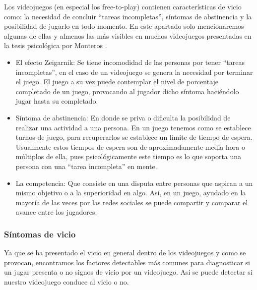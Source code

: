 Los videojuegos (en especial los free-to-play) contienen características de vicio como: la necesidad de concluir “tareas incompletas”, síntomas de abstinencia y la posibilidad de jugarlo en todo momento. En este apartado solo mencionaremos algunas de ellas y almenos las más visibles en muchos videojuegos presentadas en la tesis psicológica por Monteros \cite{montero2014ocios}.

\begin{itemize}
	\item El efecto Zeigarnik: Se tiene incomodidad de las personas por tener “tareas incompletas”, en el caso de un videojuego se genera la necesidad por terminar el juego. El juego a su vez puede contemplar el nivel de porcentaje completado de un juego, provocando al jugador dicho síntoma haciéndolo jugar hasta su completado.
	
	\item Síntoma de abstinencia: En donde se priva o dificulta la posibilidad de realizar una actividad a una persona. En un juego tenemos como se establece turnos de juego, para recuperarlos se establece un límite de tiempo de espera. Usualmente estos tiempos de espera son de aproximadamente media hora o múltiplos de ella, pues psicológicamente este tiempo es lo que soporta una persona con una “tarea incompleta” en mente.
	
	\item La competencia: Que consiste en una disputa entre personas que aspiran a un mismo objetivo o a la superioridad en algo. Así, en un juego, ayudado en la mayoría de las veces por las redes sociales se puede compartir y comparar el avance entre los jugadores.
	\\[1pt]
	
\end{itemize}

	
\subsubsection{Síntomas de vicio}

Ya que se ha presentado el vicio en general dentro de los videojuegos y como se provocan, encontramos los factores detectables más comunes para diagnosticar si un jugar presenta o no signos de vicio por un videojuego. Así se puede detectar si nuestro videojuego conduce al vicio o no.

